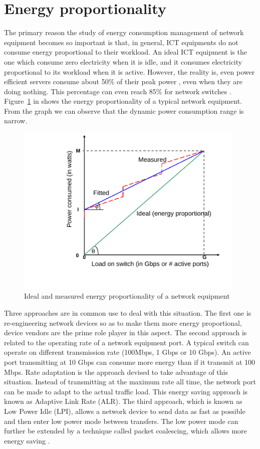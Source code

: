 \section{Energy proportionality}
\label{section:energyproportionality}
The primary reason the study of energy consumption management of network equipment becomes so important is that, in general, ICT equipments do not consume energy proportional to their workload. An ideal ICT equipment is the one which consume zero electricity when it is idle, and it consumes electricity proportional to its workload when it is active. However, the reality is, even power efficient servers consume about 50\% of their peak power \cite{DBLP:journals/computer/BarrosoH07}, even when they are doing nothing. This percentage can even reach 85\% for network switches \cite{DBLP:conf/IEEEcloud/FiandrinoKBZ15}. Figure~\ref{fig:energyproportionality} in \cite{DBLP:conf/networking/MahadevanSBR09} shows the energy proportionality of a typical network equipment. From the graph we can observe that the dynamic power consumption range is narrow.
\begin{figure}[ht]
	\begin{center}
		\includegraphics[width=11cm]{images/energyproportionality.pdf}
		\caption{Ideal and measured energy proportionality of a network equipment \cite{DBLP:conf/networking/MahadevanSBR09}}
		\label{fig:energyproportionality}
	\end{center}
\end{figure}
Three approaches are in common use to deal with this situation. The first one is re-engineering network devices so as to make them more energy proportional, device vendors are the prime role player in this aspect. The second approach is related to the operating rate of a network equipment port. A typical switch can operate on different transmission rate (100Mbps, 1 Gbps or 10 Gbps). An active port transmitting at 10 Gbps can consume more energy than if it transmit at 100 Mbps. Rate adaptation is the approach devised to take advantage of this situation. Instead of transmitting at the maximum rate all time,  the network port can be made to adapt to the actual traffic load. This energy saving approach is known as Adaptive Link Rate (ALR). The third approach, which is known as Low Power Idle (LPI), allows a network device to send data as fast as possible and then enter low power mode between transfers. The low power mode can further be extended by a technique called packet coalescing, which allows more energy saving \cite{DBLP:journals/comsur/BollaBDC11}. 
